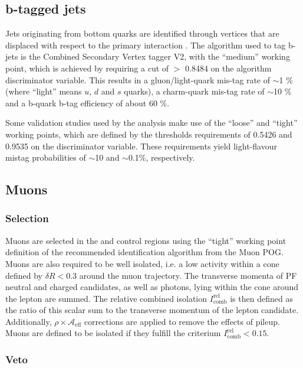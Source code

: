 \subsection{b-tagged jets}
\label{sec:btags}

Jets originating from bottom quarks are identified through vertices
that are displaced with respect to the primary interaction
\cite{Chatrchyan:2012jua}.  The algorithm used to tag b-jets is the
Combined Secondary Vertex tagger V2, with the ``medium'' working
point, which is achieved by requiring a cut of $>$ 0.8484 on the
algorithm discriminator variable.  This results in a gluon/light-quark
mis-tag rate of $\sim$1 \% (where ``light'' means $u$, $d$ and $s$
quarks), a charm-quark mis-tag rate of $\sim$10 \% and a b-quark b-tag
efficiency of about 60 \%.

Some validation studies used by the analysis make use of the ``loose''
and ``tight'' working points, which are defined by the thresholds
requirements of 0.5426 and 0.9535 on the discriminator variable. These
requirements yield light-flavour mistag probabilities of $\sim$10 and
$\sim$0.1\%, respectively.

\subsection{Muons}
\label{sec:muon-id}

\subsubsection{Selection}

Muons are selected in the \mj and \mmj control regions using the
``tight'' working point definition of the recommended identification
algorithm from the Muon POG.  Muons are also required to be well
isolated, i.e. a low activity within a cone defined by $\delta R <
0.3$ around the muon trajectory. The transverse momenta of PF neutral
and charged candidates, as well as photons, lying within the cone
around the lepton are summed. The relative combined isolation
$I^\mathrm{rel}_\mathrm{comb}$ is then defined as the ratio of this
scalar sum to the transverse momentum of the lepton
candidate. Additionally, $\rho\times \mathcal{A}_\textrm{eff}$
corrections are applied to remove the effects of pileup.  Muons are
defined to be isolated if they fulfill the criterium
$I^\mathrm{rel}_\mathrm{comb} < 0.15$.

\subsubsection{Veto}

